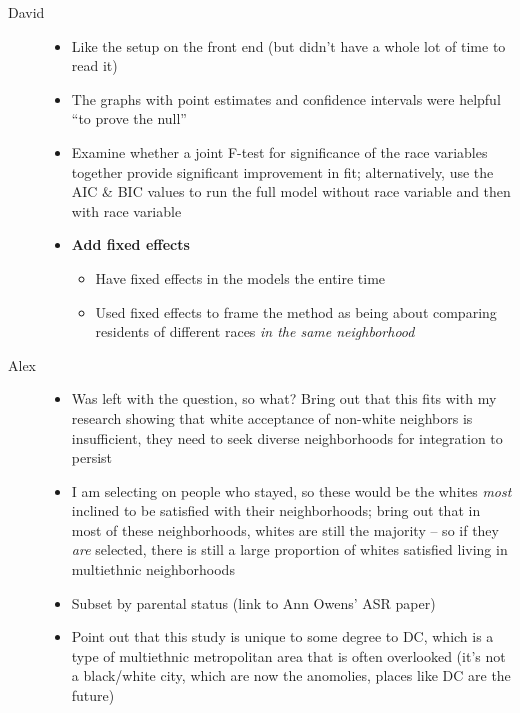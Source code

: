 \documentclass{baderart}
\providecommand{\tightlist}{%
  \setlength{\itemsep}{0pt}\setlength{\parskip}{0pt}}
\begin{document}
\begin{description} \item[David] \begin{itemize} \tightlist \item   Like the setup on the front end (but didn't have a whole lot of time   to read it) \item   The graphs with point estimates and confidence intervals were helpful   ``to prove the null'' \item   Examine whether a joint F-test for significance of the race variables   together provide significant improvement in fit; alternatively, use   the AIC \& BIC values to run the full model without race variable and   then with race variable \item   \textbf{Add fixed effects}

  \begin{itemize}   \tightlist   \item     Have fixed effects in the models the entire time   \item     Used fixed effects to frame the method as being about comparing     residents of different races \emph{in the same neighborhood}   \end{itemize} \end{itemize} \item[Alex] \begin{itemize} \tightlist \item   Was left with the question, so what? Bring out that this fits with my   research showing that white acceptance of non-white neighbors is   insufficient, they need to seek diverse neighborhoods for integration   to persist \item   I am selecting on people who stayed, so these would be the whites   \emph{most} inclined to be satisfied with their neighborhoods; bring   out that in most of these neighborhoods, whites are still the majority   -- so if they \emph{are} selected, there is still a large proportion   of whites satisfied living in multiethnic neighborhoods \item   Subset by parental status (link to Ann Owens' ASR paper) \item   Point out that this study is unique to some degree to DC, which is a   type of multiethnic metropolitan area that is often overlooked (it's   not a black/white city, which are now the anomolies, places like DC   are the future) \end{itemize} \end{description}
\end{document}
